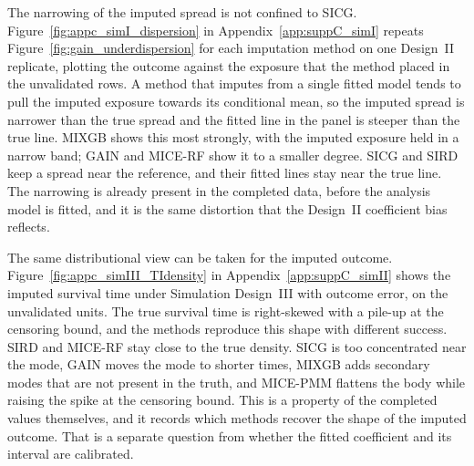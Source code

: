 The narrowing of the imputed spread is not confined to SICG. Figure~\ref{fig:appc_simI_dispersion} in Appendix~\ref{app:suppC_simI} repeats Figure~\ref{fig:gain_underdispersion} for each imputation method on one Design~II replicate, plotting the outcome against the exposure that the method placed in the unvalidated rows. A method that imputes from a single fitted model tends to pull the imputed exposure towards its conditional mean, so the imputed spread is narrower than the true spread and the fitted line in the panel is steeper than the true line. MIXGB shows this most strongly, with the imputed exposure held in a narrow band; GAIN and MICE-RF show it to a smaller degree. SICG and SIRD keep a spread near the reference, and their fitted lines stay near the true line. The narrowing is already present in the completed data, before the analysis model is fitted, and it is the same distortion that the Design~II coefficient bias reflects.

The same distributional view can be taken for the imputed outcome. Figure~\ref{fig:appc_simIII_TIdensity} in Appendix~\ref{app:suppC_simII} shows the imputed survival time under Simulation Design~III with outcome error, on the unvalidated units. The true survival time is right-skewed with a pile-up at the censoring bound, and the methods reproduce this shape with different success. SIRD and MICE-RF stay close to the true density. SICG is too concentrated near the mode, GAIN moves the mode to shorter times, MIXGB adds secondary modes that are not present in the truth, and MICE-PMM flattens the body while raising the spike at the censoring bound. This is a property of the completed values themselves, and it records which methods recover the shape of the imputed outcome. That is a separate question from whether the fitted coefficient and its interval are calibrated.

